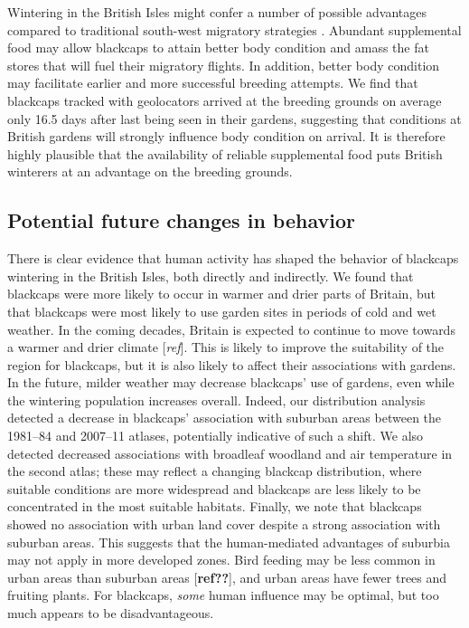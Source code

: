 \documentclass[a4paper, twoside]{templates/ociamthesis}
\begin{document}
Wintering in the British Isles might confer a number of possible advantages compared to traditional south-west migratory strategies \autocite{bertholdMigratoryBehaviourPopulation1988}. Abundant supplemental food may allow blackcaps to attain better body condition and amass the fat stores that will fuel their migratory flights. In addition, better body condition may facilitate earlier and more successful breeding attempts. We find that blackcaps tracked with geolocators arrived at the breeding grounds on average only 16.5 days after last being seen in their gardens, suggesting that conditions at British gardens will strongly influence body condition on arrival. It is therefore highly plausible that the availability of reliable supplemental food puts British winterers at an advantage on the breeding grounds.

\hypertarget{potential-future-changes-in-behavior}{%
\subsection{Potential future changes in behavior}\label{potential-future-changes-in-behavior}}

There is clear evidence that human activity has shaped the behavior of blackcaps wintering in the British Isles, both directly and indirectly. We found that blackcaps were more likely to occur in warmer and drier parts of Britain, but that blackcaps were most likely to use garden sites in periods of cold and wet weather. In the coming decades, Britain is expected to continue to move towards a warmer and drier climate {[}\emph{ref}{]}. This is likely to improve the suitability of the region for blackcaps, but it is also likely to affect their associations with gardens. In the future, milder weather may decrease blackcaps' use of gardens, even while the wintering population increases overall. Indeed, our distribution analysis detected a decrease in blackcaps' association with suburban areas between the 1981--84 and 2007--11 atlases, potentially indicative of such a shift. We also detected decreased associations with broadleaf woodland and air temperature in the second atlas; these may reflect a changing blackcap distribution, where suitable conditions are more widespread and blackcaps are less likely to be concentrated in the most suitable habitats. Finally, we note that blackcaps showed no association with urban land cover despite a strong association with suburban areas. This suggests that the human-mediated advantages of suburbia may not apply in more developed zones. Bird feeding may be less common in urban areas than suburban areas {[}\textbf{ref??}{]}, and urban areas have fewer trees and fruiting plants. For blackcaps, \emph{some} human influence may be optimal, but too much appears to be disadvantageous.
\end{document}
